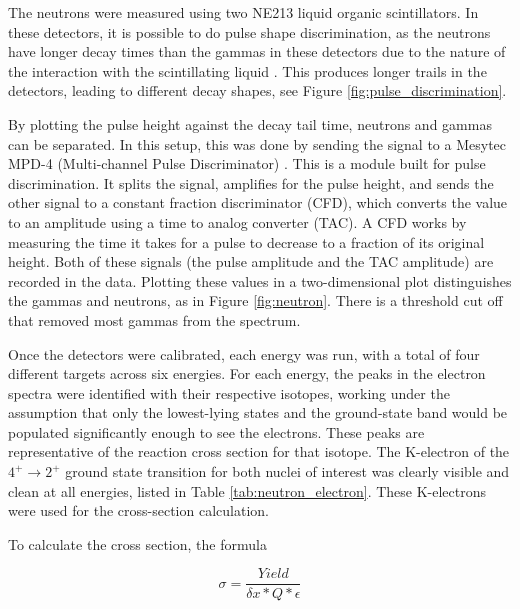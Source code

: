 The neutrons were measured using two NE213 liquid organic scintillators. In these detectors, it is possible to do pulse shape discrimination, as the neutrons have longer decay times than the gammas in these detectors due to the nature of the interaction with the scintillating liquid \citep{knoll00:rad_det_meas}. This produces longer trails in the detectors, leading to different decay shapes, see Figure \ref{fig:pulse_discrimination}. 



By plotting the pulse height against the decay tail time, neutrons and gammas can be separated. In this setup, this was done by sending the signal to a Mesytec MPD-4 (Multi-channel Pulse Discriminator) \citep{mesytec:_PSD}. This is a module built for pulse discrimination. It splits the signal, amplifies for the pulse height, and sends the other signal to a constant fraction discriminator (CFD), which converts the value to an amplitude using a time to analog converter (TAC). A CFD works by measuring the time it takes for a pulse to decrease to a fraction of its original height. Both of these signals (the pulse amplitude and the TAC amplitude) are recorded in the data. Plotting these values in a two-dimensional plot distinguishes the gammas and neutrons, as in Figure \ref{fig:neutron}. There is a threshold cut off that removed most gammas from the spectrum.



Once the detectors were calibrated, each energy was run, with a total of four different targets across six energies. For each energy, the peaks in the electron spectra were identified with their respective isotopes, working under the assumption that only the lowest-lying states and the ground-state band would be populated significantly enough to see the electrons. These peaks are representative of the reaction cross section for that isotope. The K-electron of the $4^+\rightarrow2^+$ ground state transition for both nuclei of interest was clearly visible and clean at all energies, listed in Table \ref{tab:neutron_electron}. These K-electrons were used for the cross-section calculation.



To calculate the cross section, the formula

\begin{equation}
    \sigma=\frac{Yield}{\delta x*Q*\epsilon}
    \label{eq:xs}
\end{equation}

